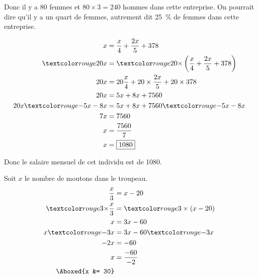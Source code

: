 \documentclass["../Cours.tex"]{subfiles}
\begin{document}
\begin{questions}
    Donc il y a 80 femmes et $80 \times 3 = 240$ hommes dans cette entreprise. On pourrait dire qu'il y a un quart de femmes, autrement dit \qty{25}{\%} de femmes dans cette entreprise.

    \exercice
    \begin{minipage}{0.4\linewidth}
        \begin{center}
        \end{center}
    \end{minipage}
    \begin{minipage}{0.5\linewidth}
        \begin{align*}
            x &= \frac{x}{4} + \frac{2x}{5} + 378 \\
            \red{20}x &= \red{20 \times} \left(\frac{x}{4} + \frac{2x}{5} + 378\right) \\
            20x &= 20\frac{x}{4} + 20 \times \frac{2x}{5} + 20 \times 378 \\
            20x &= 5x + 8x + 7560 \\
            20x \red{-5x-8x} &= 5x + 8x + 7560 \red{-5x-8x} \\
            7x &= 7560 \\
            x &= \frac{7560}{7} \\ 
            x &= \boxed{1080}
        \end{align*}

    Donc le salaire mensuel de cet individu est de \qty{1080}{\EURO}.
    \end{minipage}

    \clearpage
    \exercice Soit $x$ le nombre de moutons dans le troupeau.
    \begin{align*}
        \frac{x}{3} &= x - 20 \\
        \red{3 \times} \frac{x}{3} &= \red{3} \times \left(x-20\right) \\ 
        x &= 3x - 60 \\
        x \red{-3x} &= 3x - 60 \red{-3x} \\
        -2x &= -60 \\
        x &= \frac{-60}{-2} \\ 
        \Aboxed{x &= 30}
    \end{align*}


\end{questions}
\end{document}
